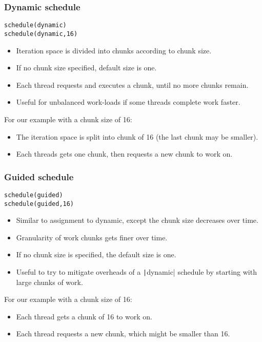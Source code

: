 \documentclass{beamer}
\begin{document}
\begin{frame}[fragile]
\frametitle{Dynamic schedule}
\begin{verbatim}
schedule(dynamic)
schedule(dynamic,16)
\end{verbatim}

\begin{itemize}
  \item Iteration space is divided into chunks according to chunk size.
  \item If no chunk size specified, default size is one.
  \item Each thread requests and executes a chunk, until no more chunks remain.
  \item Useful for unbalanced work-loads if some threads complete work faster.
\end{itemize}

For our example with a chunk size of 16:
\begin{itemize}
  \item The iteration space is split into chunk of 16 (the last chunk may be smaller).
  \item Each threads gets one chunk, then requests a new chunk to work on.
\end{itemize}

\end{frame}

\begin{frame}[fragile]
\frametitle{Guided schedule}
\begin{verbatim}
schedule(guided)
schedule(guided,16)
\end{verbatim}

\begin{itemize}
  \item Similar to assignment to dynamic, except the chunk size decreases over time.
  \item Granularity of work chunks gets finer over time.
  \item If no chunk size is specified, the default size is one.
  \item Useful to try to mitigate overheads of a \texttt|dynamic| schedule by starting with large chunks of work.
\end{itemize}

For our example with a chunk size of 16:
\begin{itemize}
  \item Each thread gets a chunk of 16 to work on.
  \item Each thread requests a new chunk, which might be smaller than 16.
\end{itemize}

\end{frame}
\end{document}
